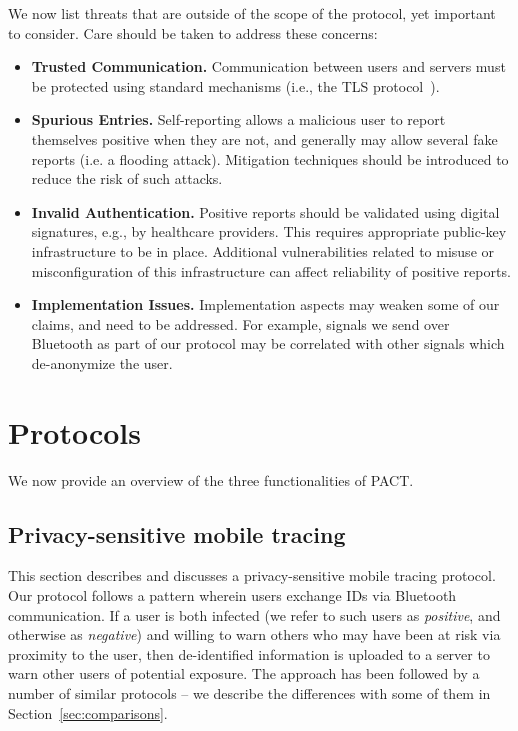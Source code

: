 \documentclass{article}
\begin{document}
We now list threats that are outside of the scope of the protocol, yet important to consider. Care should be taken to address these concerns:
\begin{itemize}
    \item {\bf Trusted Communication.} Communication between users and servers must be protected using standard mechanisms (i.e., the TLS protocol~\cite{TLS}).
    \item {\bf Spurious Entries.} Self-reporting allows a malicious user to report themselves positive when they are not, and generally may allow several fake reports (i.e. a flooding attack). Mitigation techniques should be introduced to reduce the risk of such attacks.  
    \item {\bf Invalid Authentication.} Positive reports should be validated using digital signatures, e.g., by healthcare providers. This requires appropriate public-key infrastructure to be in place. Additional vulnerabilities related to misuse or misconfiguration of this infrastructure can affect reliability of positive reports.
 \item {\bf Implementation Issues.} Implementation aspects may weaken some of our claims, and need to be addressed. For example, signals we send over Bluetooth as part of our protocol may be correlated with other signals which de-anonymize the user. 
   
    
\end{itemize}

\section{Protocols} 
We now provide an overview of the three functionalities of PACT.


\subsection{Privacy-sensitive mobile tracing} \label{sect:Bluetooth}

This section describes and discusses a privacy-sensitive mobile tracing protocol. Our protocol follows a pattern wherein users exchange IDs via Bluetooth communication.   If a user is both infected (we refer to such users as {\em positive}, and otherwise as {\em negative}) and willing to warn others who may have been at risk via proximity to the user, then de-identified information is uploaded to a server to warn other users of potential exposure. The approach has been followed by a number of similar protocols -- we describe the differences with some of them in Section~\ref{sec:comparisons}.
\end{document}
